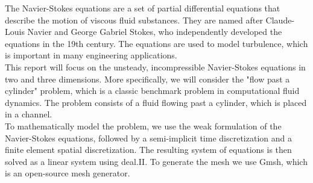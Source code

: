 The Navier-Stokes equations are a set of partial differential equations that describe the motion of viscous fluid substances. They are named after Claude-Louis Navier and George Gabriel Stokes, who independently developed the equations in the 19th century. The equations are used to model turbulence, which is important in many engineering applications. \\

This report will focus on the unsteady, incompressible Navier-Stokes equations in two and three dimensions. More specifically, we will consider the "flow past a cylinder" problem, which is a classic benchmark problem in computational fluid dynamics. The problem consists of a fluid flowing past a cylinder, which is placed in a channel. \\

To mathematically model the problem, we use the weak formulation of the Navier-Stokes equations, followed by a semi-implicit time discretization and a finite element spatial discretization. The resulting system of equations is then solved as a linear system using deal.II. To generate the mesh we use Gmsh, which is an open-source mesh generator.